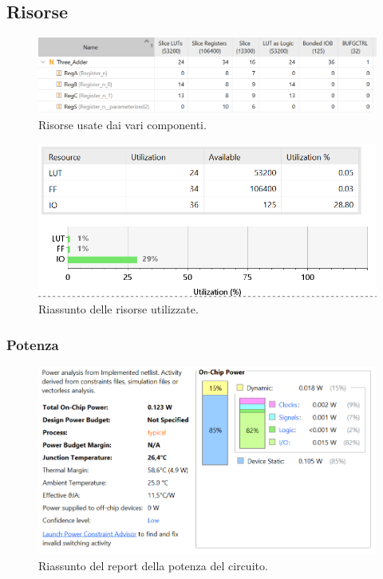 \documentclass[12pt]{article}
\begin{document}
        \subsection{Risorse}
            \begin{figure}[ht]
                \centering
                \includegraphics[scale=0.75]{Risorse_1.png}
                \caption{Risorse usate dai vari componenti.}
            \end{figure}

            \begin{figure}[ht]
                \centering
                \includegraphics[scale=0.8]{Risorse_2.png}
                \caption{Riassunto delle risorse utilizzate.}
            \end{figure}
            \newpage

            \subsubsection{Potenza}
                \begin{figure}[ht]
                    \centering
                    \includegraphics[scale=0.8]{Power.png}
                    \caption{Riassunto del report della potenza del circuito.}
                \end{figure}
\end{document}
